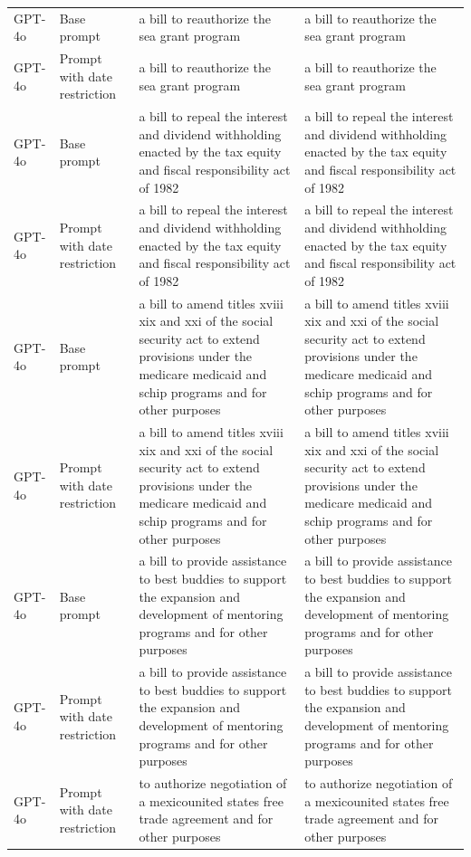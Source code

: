 \begin{longtable}{>{\raggedright\arraybackslash}p{1.4cm}>{\raggedright\arraybackslash}p{1.4cm}>{\raggedright\arraybackslash}p{5.5cm}>{\raggedright\arraybackslash}p{5.5cm}}
GPT-4o & Base prompt & a bill to reauthorize the sea grant program & a bill to reauthorize the sea grant program\\
GPT-4o & Prompt with date restriction & a bill to reauthorize the sea grant program & a bill to reauthorize the sea grant program\\
GPT-4o & Base prompt & a bill to repeal the interest and dividend withholding enacted by the tax equity and fiscal responsibility act of 1982 & a bill to repeal the interest and dividend withholding enacted by the tax equity and fiscal responsibility act of 1982\\
GPT-4o & Prompt with date restriction & a bill to repeal the interest and dividend withholding enacted by the tax equity and fiscal responsibility act of 1982 & a bill to repeal the interest and dividend withholding enacted by the tax equity and fiscal responsibility act of 1982\\
GPT-4o & Base prompt & a bill to amend titles xviii xix and xxi of the social security act to extend provisions under the medicare medicaid and schip programs and for other purposes & a bill to amend titles xviii xix and xxi of the social security act to extend provisions under the medicare medicaid and schip programs and for other purposes\\
GPT-4o & Prompt with date restriction & a bill to amend titles xviii xix and xxi of the social security act to extend provisions under the medicare medicaid and schip programs and for other purposes & a bill to amend titles xviii xix and xxi of the social security act to extend provisions under the medicare medicaid and schip programs and for other purposes\\
GPT-4o & Base prompt & a bill to provide assistance to best buddies to support the expansion and development of mentoring programs and for other purposes & a bill to provide assistance to best buddies to support the expansion and development of mentoring programs and for other purposes\\
GPT-4o & Prompt with date restriction & a bill to provide assistance to best buddies to support the expansion and development of mentoring programs and for other purposes & a bill to provide assistance to best buddies to support the expansion and development of mentoring programs and for other purposes\\
GPT-4o & Prompt with date restriction & to authorize negotiation of a mexicounited states free trade agreement and for other purposes & to authorize negotiation of a mexicounited states free trade agreement and for other purposes\\

\end{longtable}
